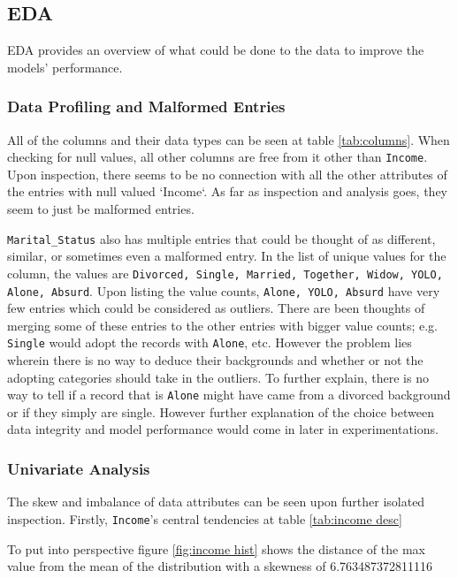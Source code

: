 \subsection{EDA}

EDA provides an overview of what could be done to the data to improve the models' performance. 

\subsubsection{Data Profiling and Malformed Entries}

All of the columns and their data types can be seen at table \ref{tab:columns}. When checking for null values, all other columns are free from it other than \texttt{Income}. Upon inspection, there seems to be no connection with all the other attributes of the entries with null valued `Income`. As far as inspection and analysis goes, they seem to just be malformed entries. 

\texttt{Marital\_Status} also has multiple entries that could be thought of as different, similar, or sometimes even a malformed entry. In the list of unique values for the column, the values are \texttt{Divorced, Single, Married, Together, Widow, YOLO, Alone, Absurd}. Upon listing the value counts, \texttt{Alone, YOLO, Absurd} have very few entries which could be considered as outliers. There are been thoughts of merging some of these entries to the other entries with bigger value counts; e.g. \texttt{Single} would adopt the records with \texttt{Alone}, etc. However the problem lies wherein there is no way to deduce their backgrounds and whether or not the adopting categories should take in the outliers. To further explain, there is no way to tell if a record that is \texttt{Alone} might have came from a divorced background or if they simply are single. However further explanation of the choice between data integrity and model performance would come in later in experimentations.

\subsubsection{Univariate Analysis}

The skew and imbalance of data attributes can be seen upon further isolated inspection. Firstly, \texttt{Income}'s central tendencies at table \ref{tab:income desc}

To put into perspective figure \ref{fig:income hist} shows the distance of the max value from the mean of the distribution with a skewness of 6.763487372811116

